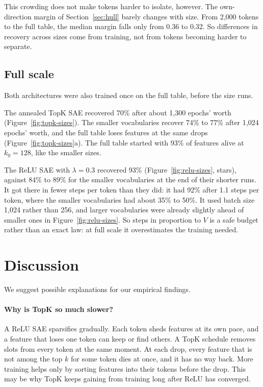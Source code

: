 \documentclass[11pt]{article}
\begin{document}
This crowding does not make tokens harder to isolate, however. The own-direction margin of Section~\ref{sec:hull} barely changes with size. From 2,000 tokens to the full table, the median margin falls only from 0.36 to 0.32. So differences in recovery across sizes come from training, not from tokens becoming harder to separate.

\subsection{Full scale}
\label{sec:fullscale}

Both architectures were also trained once on the full table, before the size runs.

The annealed TopK SAE recovered 70\% after about 1,300 epochs' worth (Figure~\ref{fig:topk-sizes}). The smaller vocabularies recover 74\% to 77\% after 1,024 epochs' worth, and the full table loses features at the same drops (Figure~\ref{fig:topk-sizes}a). The full table started with 93\% of features alive at $k_0 = 128$, like the smaller sizes.

The ReLU SAE with $\lambda = 0.3$ recovered 93\% (Figure~\ref{fig:relu-sizes}, stars), against 84\% to 89\% for the smaller vocabularies at the end of their shorter runs. It got there in fewer steps per token than they did: it had 92\% after 1.1 steps per token, where the smaller vocabularies had about 35\% to 50\%. It used batch size 1,024 rather than 256, and larger vocabularies were already slightly ahead of smaller ones in Figure~\ref{fig:relu-sizes}. So steps in proportion to $V$ is a safe budget rather than an exact law: at full scale it overestimates the training needed.

\section{Discussion}
\label{sec:discussion}

We suggest possible explanations for our empirical findings.

\paragraph{Why is TopK so much slower?} A ReLU SAE sparsifies gradually. Each token sheds features at its own pace, and a feature that loses one token can keep or find others. A TopK schedule removes slots from every token at the same moment. At each drop, every feature that is not among the top $k$ for some token dies at once, and it has no way back. More training helps only by sorting features into their tokens before the drop. This may be why TopK keeps gaining from training long after ReLU has converged.
\end{document}
